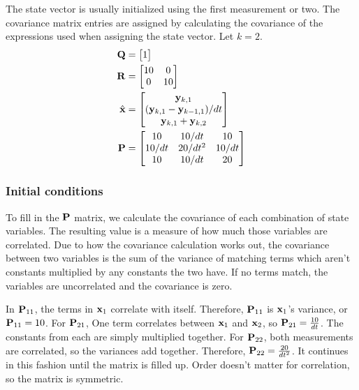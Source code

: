 The \gls{state} vector is usually initialized using the first measurement or
two. The covariance matrix entries are assigned by calculating the covariance of
the expressions used when assigning the state vector. Let $k = 2$.
\begin{align}
  \mathbf{Q} &= \begin{bmatrix}1\end{bmatrix} \\
  \mathbf{R} &=
  \begin{bmatrix}
    10 & 0 \\
    0 & 10
  \end{bmatrix} \\
  \hat{\mathbf{x}} &=
  \begin{bmatrix}
    \mathbf{y}_{k,1} \\
    (\mathbf{y}_{k,1} - \mathbf{y}_{k-1,1})/dt \\
    \mathbf{y}_{k,1} + \mathbf{y}_{k,2}
  \end{bmatrix} \\
  \mathbf{P} &=
  \begin{bmatrix}
    10 & 10/dt & 10 \\
    10/dt & 20/dt^2 & 10/dt \\
    10 & 10/dt & 20
  \end{bmatrix}
\end{align}

\subsubsection{Initial conditions}

To fill in the $\mathbf{P}$ matrix, we calculate the covariance of each combination
of \gls{state} variables. The resulting value is a measure of how much those
variables are correlated. Due to how the covariance calculation works out, the
covariance between two variables is the sum of the variance of matching terms
which aren't constants multiplied by any constants the two have. If no terms
match, the variables are uncorrelated and the covariance is zero.

In $\mathbf{P}_{11}$, the terms in $\mathbf{x}_1$ correlate with itself. Therefore,
$\mathbf{P}_{11}$ is $\mathbf{x}_1$'s variance, or $\mathbf{P}_{11} = 10$. For
$\mathbf{P}_{21}$, One term correlates between $\mathbf{x}_1$ and $\mathbf{x}_2$, so
$\mathbf{P}_{21} = \frac{10}{dt}$. The constants from each are simply multiplied
together. For $\mathbf{P}_{22}$, both measurements are correlated, so the variances
add together. Therefore, $\mathbf{P}_{22} = \frac{20}{dt^2}$. It continues in this
fashion until the matrix is filled up. Order doesn't matter for correlation, so
the matrix is symmetric.

